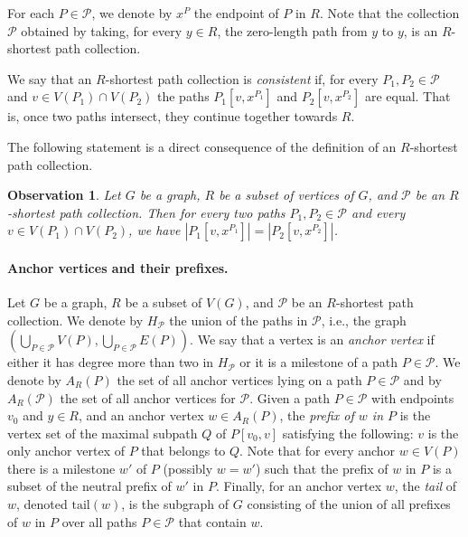 \documentclass[11pt,a4paper]{article}
\newtheorem{observation}{Observation}[section]
\begin{document}
For each $P \in \mathcal{P}$, we denote by $x^P$ the endpoint of $P$ in $R$.
Note that the collection $\mathcal{P}$ obtained by taking, for every $y\in R$, the zero-length path from $y$ to $y$, is an $R$-shortest path collection. 

We say that an $R$-shortest path collection is \emph{consistent} if, for every $P_1,P_2 \in \mathcal{P}$
and $v \in V(P_1) \cap V(P_2)$ the paths $P_1[v,x^{P_1}]$ and $P_2[v,x^{P_2}]$ are equal. That is, 
once two paths intersect, they continue together towards $R$. 

The following statement is a direct consequence of the definition of an $R$-shortest path collection.
\begin{observation}\label{obs:short}
  Let $G$ be a graph, $R$ be a subset of vertices of $G$, and $\mathcal{P}$ be an $R$-shortest path collection. Then for every two paths $P_1,P_2\in \mathcal{P}$ and every $v\in V(P_1)\cap V(P_2)$, we have $|P_1[v,x^{P_1}]|=|P_2[v,x^{P_2}]|$.
\end{observation}

\paragraph{Anchor vertices and their prefixes.}
Let $G$ be a graph, $R$ be a subset of $V(G)$, and $\mathcal{P}$ be an $R$-shortest path collection. We denote by $H_{\mathcal{P}}$ the union of the paths in $\mathcal{P}$, i.e., the graph $(\bigcup_{P\in\mathcal{P}}V(P),\bigcup_{P\in\mathcal{P}}E(P))$.
We say that a vertex is an \emph{anchor vertex} if either it has degree more than two in $H_{\mathcal{P}}$
or it is a milestone of a path $P \in \mathcal{P}$.
We denote by $A_R(P)$ the set of all anchor vertices lying on a path $P \in \mathcal{P}$
and by $A_R(\mathcal{P})$ the set of all anchor vertices for $\mathcal{P}$.
Given a path $P\in\mathcal{P}$ with endpoints $v_0$ and $y\in R$, and an anchor vertex $w\in A_R(P)$,
the \emph{prefix of $w$ in $P$} is the vertex set of the maximal subpath $Q$ of
$P[v_0,v]$ satisfying the following: $v$ is the only anchor vertex of $P$ that belongs to $Q$.
Note that for every anchor $w\in V(P)$ there is a milestone $w'$ of $P$ (possibly $w=w'$)
such that the prefix of $w$ in $P$ is a subset of the neutral prefix of $w'$ in $P$.
Finally, for an anchor vertex $w$, the \emph{tail} of $w$, 
denoted $\mathrm{tail}(w)$, is the subgraph of $G$ consisting
of the union of all prefixes of $w$ in $P$ over all paths $P \in \mathcal{P}$ that contain $w$.
\end{document}
